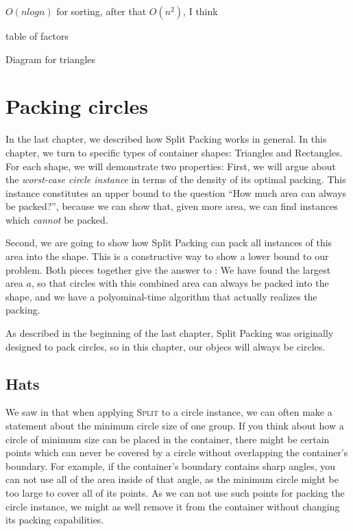 \documentclass[a4paper,style=print,oneside,bibliography=totoc,nexus,lnum,extramargin]{tubsbook}
\begin{document}
$O(n log n)$ for sorting, after that $O(n^2)$, I think

table of factors

Diagram for triangles

\chapter{Packing circles}\label{ch:circles}

In the last chapter, we described how Split Packing works in general. In this chapter, we turn to specific types of container shapes: Triangles and Rectangles. For each shape, we will demonstrate two properties: First, we will argue about the \emph{worst-case circle instance} in terms of the density of its optimal packing. This instance constitutes an upper bound to the question “How much area can always be packed?”, because we can show that, given more area, we can find instances which \emph{cannot} be packed.

Second, we are going to show how Split Packing can pack all instances of this area into the shape. This is a constructive way to show a lower bound to our problem. Both pieces together give the answer to : We have found the largest area $a$, so that circles with this combined area can always be packed into the shape, and we have a polyominal-time algorithm that actually realizes the packing.

As described in the beginning of the last chapter, Split Packing was originally designed to pack circles, so in this chapter, our objecs will always be circles.


\section{Hats}

We saw in  that when applying \textsc{Split} to a circle instance, we can often make a statement about the minimum circle size of one group.
If you think about how a circle of minimum size can be placed in the container, there might be certain points which can never be covered by a circle without overlapping the container's boundary. For example, if the container's boundary contains sharp angles, you can not use all of the area inside of that angle, as the minimum circle might be too large to cover all of its points. As we can not use such points for packing the circle instance, we might as well remove it from the container without changing its packing capabilities.
\end{document}
